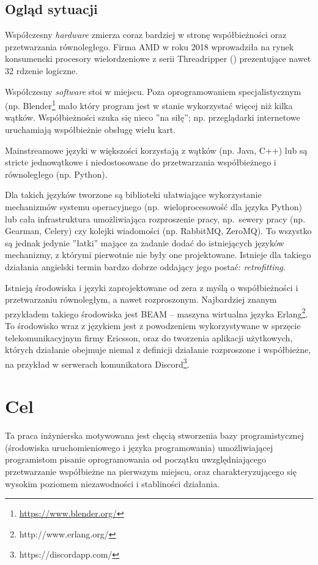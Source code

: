 \subsection{Ogląd sytuacji}

Współczesny \emph{hardware} zmierza coraz bardziej w stronę współbieżności oraz przetwarzania równoległego.
Firma AMD w roku 2018 wprowadziła na rynek konsumencki procesory wielordzeniowe z serii
Threadripper (\cite{AmdProductThreadripper}) prezentujące nawet 32 rdzenie logiczne.

Współczesny \emph{software} stoi w miejscu. Poza oprogramowaniem specjalistycznym (np.
Blender\footnote{\url{https://www.blender.org/}} mało który program jest w stanie wykorzystać więcej niż
kilka wątków.  Współbieżności szuka się nieco ''na siłę''; np. przeglądarki internetowe uruchamiają
współbieżnie obsługę wielu kart.

Mainstreamowe języki w większości korzystają z wątków (np. Java, C++) lub są stricte jednowątkowe i
niedostosowane do przetwarzania współbieżnego i równoległego (np. Python).

Dla takich języków tworzone są biblioteki ułatwiające wykorzystanie mechanizmów systemu operacyjnego
(np.~wieloprocesowość dla języka Python) lub cała infrastruktura umożliwiająca rozproszenie pracy,
np.~sewery pracy (np. Gearman, Celery) czy kolejki wiadomości (np. RabbitMQ, ZeroMQ).
To wszystko są jednak jedynie ''łatki'' mające za zadanie dodać do istniejących języków mechanizmy, z którymi
pierwotnie nie były one projektowane. Istnieje dla takiego działania angielski termin bardzo dobrze oddający
jego postać: \emph{retrofitting}.

Istnieją środowiska i języki zaprojektowane od zera z myślą o współbieżności i przetwarzaniu równoległym, a
nawet rozproszonym.
Najbardziej znanym przykładem takiego środowiska jest BEAM -- maszyna wirtualna
języka Erlang\footnote{http://www.erlang.org/}. To środowisko wraz z językiem jest z powodzeniem
wykorzystywane w sprzęcie telekomunikacyjnym firmy Ericsson, oraz do tworzenia aplikacji użytkowych, których
działanie obejmuje niemal z definicji działanie rozproszone i współbieżne, na przykład w serwerach
komunikatora Discord\footnote{https://discordapp.com/}.

\section{Cel}

Ta praca inżynierska motywowana jest chęcią stworzenia bazy programistycznej (środowiska uruchomieniowego i
języka programowania) umożliwiającej programistom pisanie oprogramowania od początku uwzględniającego
przetwarzanie współbieżne na pierwszym miejscu, oraz charakteryzującego się wysokim poziomem niezawodności i
stabliności działania.


